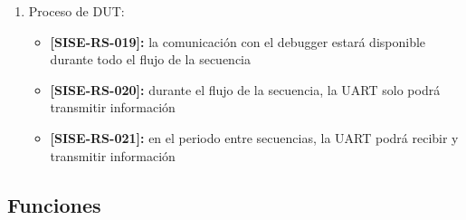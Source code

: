 \documentclass[
11pt, %
codirector, %
]{charter}
\def\codigo{SISE-RS}
\newcommand{\req}[1]{\textbf{[\codigo-#1]:}}
\begin{document}
\begin{enumerate}
\begin{enumerate}
\begin{itemize}
\begin{itemize}
							\item \req{016} se indicará en todo momento el nodo actual y todos los nodos que lleven a la raíz del árbol
						\end{itemize}
				\end{itemize}
			\item Con DUT:
				\begin{itemize}
					\item \req{017} la comunicación con UART será en 9600 baudios, 8 bits de datos, 1 bit de parada y 0 bits de paridad
					\item \req{018} la comunicación con el debugger conformará con la configuración recomendada por el fabricante
				\end{itemize}
		\end{enumerate}
	\item Proceso de DUT:
		\begin{itemize}
			\item \req{019} la comunicación con el debugger estará disponible durante todo el flujo de la secuencia
			\item \req{020} durante el flujo de la secuencia, la UART solo podrá transmitir información
			\item \req{021} en el periodo entre secuencias, la UART podrá recibir y transmitir información
		\end{itemize}
\end{enumerate}

\subsection{Funciones}
\label{sub:funciones}
\end{document}
